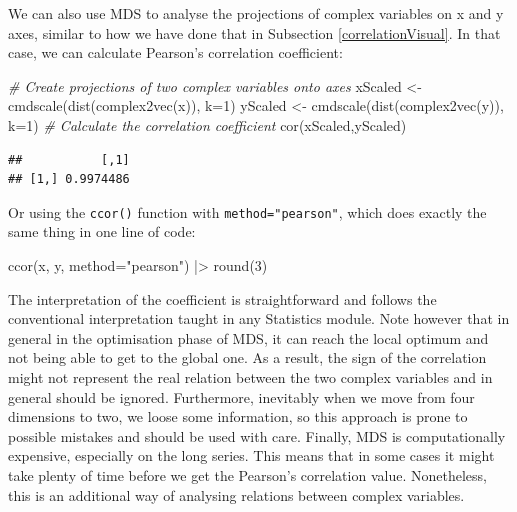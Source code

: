 \documentclass[
]{book}
\newenvironment{Shaded}{\begin{snugshade}}{\end{snugshade}}
\newcommand{\AttributeTok}[1]{\textcolor[rgb]{0.77,0.63,0.00}{#1}}
\newcommand{\CommentTok}[1]{\textcolor[rgb]{0.56,0.35,0.01}{\textit{#1}}}
\newcommand{\DecValTok}[1]{\textcolor[rgb]{0.00,0.00,0.81}{#1}}
\newcommand{\FunctionTok}[1]{\textcolor[rgb]{0.00,0.00,0.00}{#1}}
\newcommand{\NormalTok}[1]{#1}
\newcommand{\OtherTok}[1]{\textcolor[rgb]{0.56,0.35,0.01}{#1}}
\newcommand{\SpecialCharTok}[1]{\textcolor[rgb]{0.00,0.00,0.00}{#1}}
\newcommand{\StringTok}[1]{\textcolor[rgb]{0.31,0.60,0.02}{#1}}
\begin{document}
We can also use MDS to analyse the projections of complex variables on x and y axes, similar to how we have done that in Subsection \ref{correlationVisual}. In that case, we can calculate Pearson's correlation coefficient:

\begin{Shaded}
\begin{Highlighting}[]
\CommentTok{\# Create projections of two complex variables onto axes}
\NormalTok{xScaled }\OtherTok{\textless{}{-}} \FunctionTok{cmdscale}\NormalTok{(}\FunctionTok{dist}\NormalTok{(}\FunctionTok{complex2vec}\NormalTok{(x)), }\AttributeTok{k=}\DecValTok{1}\NormalTok{)}
\NormalTok{yScaled }\OtherTok{\textless{}{-}} \FunctionTok{cmdscale}\NormalTok{(}\FunctionTok{dist}\NormalTok{(}\FunctionTok{complex2vec}\NormalTok{(y)), }\AttributeTok{k=}\DecValTok{1}\NormalTok{)}
\CommentTok{\# Calculate the correlation coefficient}
\FunctionTok{cor}\NormalTok{(xScaled,yScaled)}
\end{Highlighting}
\end{Shaded}

\begin{verbatim}
##           [,1]
## [1,] 0.9974486
\end{verbatim}

Or using the \texttt{ccor()} function with \texttt{method="pearson"}, which does exactly the same thing in one line of code:

\begin{Shaded}
\begin{Highlighting}[]
\FunctionTok{ccor}\NormalTok{(x, y, }\AttributeTok{method=}\StringTok{"pearson"}\NormalTok{) }\SpecialCharTok{|\textgreater{}} \FunctionTok{round}\NormalTok{(}\DecValTok{3}\NormalTok{)}
\end{Highlighting}
\end{Shaded}

The interpretation of the coefficient is straightforward and follows the conventional interpretation taught in any Statistics module. Note however that in general in the optimisation phase of MDS, it can reach the local optimum and not being able to get to the global one. As a result, the sign of the correlation might not represent the real relation between the two complex variables and in general should be ignored. Furthermore, inevitably when we move from four dimensions to two, we loose some information, so this approach is prone to possible mistakes and should be used with care. Finally, MDS is computationally expensive, especially on the long series. This means that in some cases it might take plenty of time before we get the Pearson's correlation value. Nonetheless, this is an additional way of analysing relations between complex variables.
\end{document}
